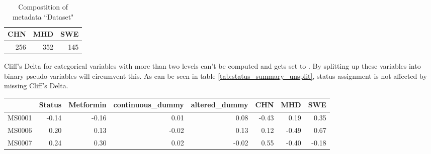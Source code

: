 \documentclass{article}\usepackage[]{graphicx}\usepackage[usenames,dvipsnames]{color}
\newcommand{\hlnum}[1]{\textcolor[rgb]{0.816,0.125,0.439}{#1}}%
\newcommand{\hlstr}[1]{\textcolor[rgb]{0.251,0.627,0.251}{#1}}%
\newcommand{\hlopt}[1]{\textcolor[rgb]{0,0,0}{#1}}%
\newcommand{\hlstd}[1]{\textcolor[rgb]{0.251,0.251,0.251}{#1}}%
\newcommand{\hlkwb}[1]{\textcolor[rgb]{0,0,0}{#1}}%
\newcommand{\hlkwc}[1]{\textcolor[rgb]{0.251,0.251,0.251}{#1}}%
\newcommand{\hlkwd}[1]{\textcolor[rgb]{0.878,0.439,0.125}{#1}}%
\newenvironment{knitrout}{}{} %
\begin{document}
\begin{table}
	\caption{Compostition of metadata ``Dataset"}
	\label{tab:Dataset_composition}
\begin{knitrout}
\color{fgcolor}
\begin{tabular}{rrr}
\toprule
CHN & MHD & SWE\\
\midrule
256 & 352 & 145\\
\bottomrule
\end{tabular}


\end{knitrout}
\end{table}

Cliff's Delta for categorical variables with more than two levels can't be computed and gets set to . By splitting up these variables into binary pseudo-variables will circumvent this. As can be seen in table \ref{tab:status_summary_unsplit}, status assignment is not affected by missing Cliff's Delta.
\begin{knitrout}
\color{fgcolor}
\begin{tabular}{lrrrrrrr}
\toprule
  & Status & Metformin & continuous\_dummy & altered\_dummy & CHN & MHD & SWE\\
\midrule
MS0001 & -0.14 & -0.16 & 0.01 & 0.08 & -0.43 & 0.19 & 0.35\\
MS0006 & 0.20 & 0.13 & -0.02 & 0.13 & 0.12 & -0.49 & 0.67\\
MS0007 & 0.24 & 0.30 & 0.02 & -0.02 & 0.55 & -0.40 & -0.18\\
\bottomrule
\end{tabular}


\end{knitrout}

\end{document}
